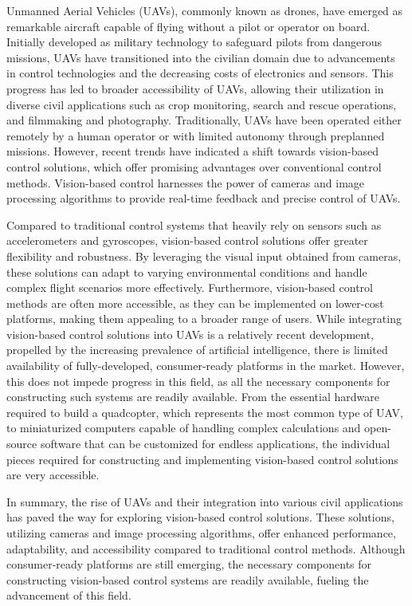 Unmanned Aerial Vehicles (UAVs), commonly known as drones, have emerged as remarkable aircraft capable of flying without a pilot or operator on board. Initially developed as military technology to safeguard pilots from dangerous missions, UAVs have transitioned into the civilian domain due to advancements in control technologies and the decreasing costs of electronics and sensors. This progress has led to broader accessibility of UAVs, allowing their utilization in diverse civil applications such as crop monitoring, search and rescue operations, and filmmaking and photography.
Traditionally, UAVs have been operated either remotely by a human operator or with limited autonomy through preplanned missions. However, recent trends have indicated a shift towards vision-based control solutions, which offer promising advantages over conventional control methods. Vision-based control harnesses the power of cameras and image processing algorithms to provide real-time feedback and precise control of UAVs.

Compared to traditional control systems that heavily rely on sensors such as accelerometers and gyroscopes, vision-based control solutions offer greater flexibility and robustness. By leveraging the visual input obtained from cameras, these solutions can adapt to varying environmental conditions and handle complex flight scenarios more effectively. Furthermore, vision-based control methods are often more accessible, as they can be implemented on lower-cost platforms, making them appealing to a broader range of users.
While integrating vision-based control solutions into UAVs is a relatively recent development, propelled by the increasing prevalence of artificial intelligence, there is limited availability of fully-developed, consumer-ready platforms in the market. However, this does not impede progress in this field, as all the necessary components for constructing such systems are readily available. From the essential hardware required to build a quadcopter, which represents the most common type of UAV, to miniaturized computers capable of handling complex calculations and open-source software that can be customized for endless applications, the individual pieces required for constructing and implementing vision-based control solutions are very accessible.

In summary, the rise of UAVs and their integration into various civil applications has paved the way for exploring vision-based control solutions. These solutions, utilizing cameras and image processing algorithms, offer enhanced performance, adaptability, and accessibility compared to traditional control methods. Although consumer-ready platforms are still emerging, the necessary components for constructing vision-based control systems are readily available, fueling the advancement of this field.

